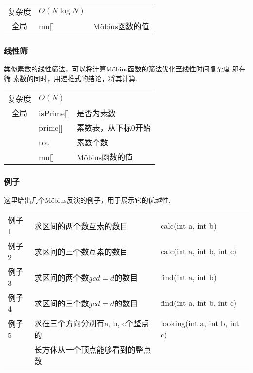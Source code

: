 \begin{longtable}{|c|l|l|}
复杂度 & $O(N\log N)$ &  \\
全局 & mu[] & M\"{o}bius函数的值 \\ 
\end{longtable}



        \subsubsection{线性筛}\small
类似素数的线性筛法，可以将计算M\"{o}bius函数的筛法优化至线性时间复杂度.即在筛
素数的同时，用递推式的结论，将其计算.

\begin{longtable}{|c|l|l|}
复杂度 & $O(N)$ &  \\
全局 & isPrime[] & 是否为素数 \\
 & prime[] & 素数表，从下标0开始 \\
 & tot & 素数个数 \\
 & mu[] & M\"{o}bius函数的值 \\ 
\end{longtable}



        \subsubsection{例子}\small
这里给出几个M\"{o}bius反演的例子，用于展示它的优越性.
\begin{longtable}{|l|l|l|}
例子1 & 求区间的两个数互素的数目 & calc(int a, int b) \\
例子2 & 求区间的三个数互素的数目 & calc(int a, int b, int c) \\
例子3 & 求区间的两个数$gcd = d$的数目 & find(int a, int b) \\
例子4 & 求区间的三个数$gcd = d$的数目 & find(int a, int b, int c) \\
例子5 & 求在三个方向分别有a, b, c个整点的 & looking(int a, int b, int c) \\
      & 长方体从一个顶点能够看到的整点数 &  \\
\end{longtable}




